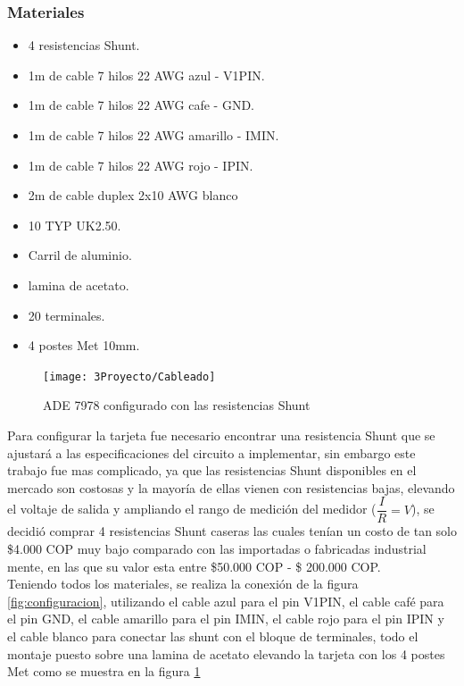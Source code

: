         \subsubsection{Materiales}
            \begin{itemize}
                \itemsep0em
                \item 4 resistencias Shunt.
                \item 1m de cable 7 hilos 22 AWG azul - V1PIN.
                \item 1m de cable 7 hilos 22 AWG cafe - GND.
                \item 1m de cable 7 hilos 22 AWG amarillo - IMIN.
                \item 1m de cable 7 hilos 22 AWG rojo - IPIN.
                \item 2m de cable duplex 2x10 AWG blanco
                \item 10 TYP UK2.50.
                \item Carril de aluminio.
                \item lamina de acetato.
                \item 20 terminales.
                \item 4 postes Met 10mm.
            
            \end{itemize}

            \begin{figure}[H]
                \begin{center}
                    \texttt{[image: 3Proyecto/Cableado]}
                    \caption{ ADE 7978 configurado con las resistencias Shunt} 
                    \label{fig:Cableado}
                \end{center}
            \end{figure}
        Para configurar la tarjeta fue necesario encontrar una resistencia Shunt que se ajustará a las especificaciones del circuito a implementar, sin embargo este trabajo fue mas complicado, ya que las resistencias Shunt disponibles en el mercado son costosas y la mayoría de ellas vienen con resistencias bajas, elevando el voltaje de salida y ampliando el rango de medición del medidor ($\dfrac{I}{R}=V$), se decidió comprar 4 resistencias Shunt caseras las cuales tenían un costo de tan solo \$4.000 COP muy bajo comparado con las importadas o fabricadas industrial mente, en las que su valor esta entre \$50.000 COP - \$ 200.000 COP.\\
        Teniendo todos los materiales, se realiza la conexión de la figura \ref{fig:configuracion}, utilizando el cable azul para el pin V1PIN, el cable café para el pin GND, el cable amarillo para el pin IMIN, el cable rojo para el pin IPIN y el cable blanco para conectar las shunt con el bloque de terminales, todo el montaje puesto sobre una lamina de acetato elevando la tarjeta con los 4 postes Met como se muestra en la figura \ref{fig:Cableado}\\

